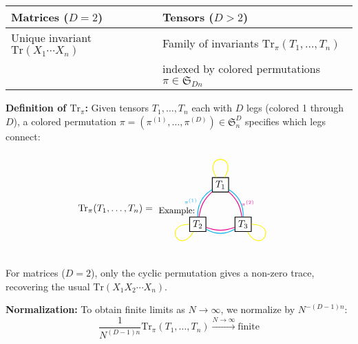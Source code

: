 \begin{center}
\begin{tabular}{|l|l|}
\hline
Matrices ($D=2$) & Tensors ($D>2$) \\
\hline
Unique invariant $\mathrm{Tr}(X_1 \cdots X_n)$ & Family of invariants $\mathrm{Tr}_{\pi}(T_1,\ldots,T_n)$ \\
& indexed by colored permutations $\pi \in \mathfrak{S}_{Dn}$ \\
\hline
\end{tabular}
\end{center}

\textbf{Definition of $\mathrm{Tr}_{\pi}$:} Given tensors $T_1,\ldots,T_n$ each with $D$ legs (colored 1 through $D$), a colored permutation $\pi = (\pi^{(1)},\ldots,\pi^{(D)}) \in \mathfrak{S}_n^D$ specifies which legs connect:

\[
\mathrm{Tr}_{\pi}(T_1,\ldots,T_n) = 
\begin{tikzpicture}[baseline=0, scale=0.8]
   \node at (-2,0) {\small Example:};
   \node[draw, thick] (T1) at (90:1.2) {$T_1$};
   \node[draw, thick] (T2) at (210:1.2) {$T_2$};
   \node[draw, thick] (T3) at (330:1.2) {$T_3$};
   
   \draw[cyan, thick] (T1) to[bend right=30] node[midway, left] {\tiny $\pi^{(1)}$} (T2);
   \draw[cyan, thick] (T2) to[bend right=30] (T3);
   \draw[cyan, thick] (T3) to[bend right=30] (T1);
   
   \draw[magenta, thick] (T1) to[bend left=20] node[midway, right] {\tiny $\pi^{(2)}$} (T3);
   \draw[magenta, thick] (T3) to[bend left=20] (T2);
   \draw[magenta, thick] (T2) to[bend left=20] (T1);
   
   \draw[yellow, thick] (T1) to[out=60,in=120,looseness=8] (T1);
   \draw[yellow, thick] (T2) to[out=180,in=240,looseness=8] (T2);
   \draw[yellow, thick] (T3) to[out=300,in=360,looseness=8] (T3);
\end{tikzpicture}
\]

For matrices ($D=2$), only the cyclic permutation gives a non-zero trace, recovering the usual $\mathrm{Tr}(X_1 X_2 \cdots X_n)$.

\textbf{Normalization:} To obtain finite limits as $N \to \infty$, we normalize by $N^{-(D-1)n}$:
\[
   \frac{1}{N^{(D-1)n}} \mathrm{Tr}_{\pi}(T_1,\ldots,T_n) \xrightarrow{N \to \infty} \text{finite}
\]

